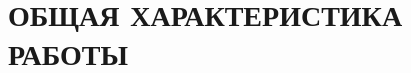 
\section*{ОБЩАЯ ХАРАКТЕРИСТИКА РАБОТЫ}

\newcommand{\actuality}{\pdfbookmark[1]{Актуальность}{actuality}\paragraph{Актуальность темы.}}
\newcommand{\aim}{\pdfbookmark[1]{Цель}{aim}\paragraph{Цель работы.}}
\newcommand{\tasks}{\pdfbookmark[1]{Задачи}{tasks}\paragraph{Задачи работы.}}
\newcommand{\novelty}{\pdfbookmark[1]{Новизна}{novelty}\paragraph{Научная новизна.}}
\newcommand{\influence}{\pdfbookmark[1]{Значимость}{influence}\paragraph{Теоретическая и практическая значимость.}}
\newcommand{\methods}{\pdfbookmark[1]{Методы}{methods}\paragraph{Методы и инструменты исследования.}}
\newcommand{\defpositions}{\pdfbookmark[1]{Положения}{defpositions}\paragraph{Основные положения, выносимые на защиту.}}
\newcommand{\relevance}{\pdfbookmark[1]{Соответствие специальности}{relevance}\paragraph{Соответствие специальность.}}
